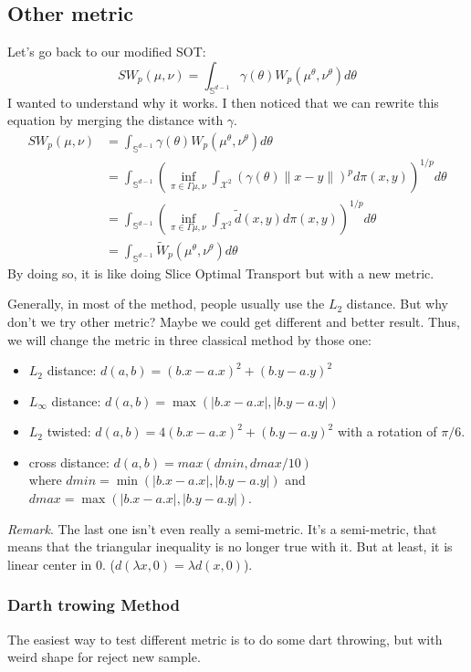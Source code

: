 \documentclass{classeENS}
\begin{document}
\subsection{Other metric}

Let's go back to our modified SOT:
\[SW_p(\mu, \nu) = \int_{\mathbb{S}^{d-1}} \gamma(\theta) W_p(\mu^\theta,\nu^\theta) d\theta\]
I wanted to understand why it works. I then noticed that we can rewrite this equation by merging
the distance with $\gamma$. 
\begin{align*}
    SW_p(\mu, \nu) &= \int_{\mathbb{S}^{d-1}} \gamma(\theta) W_p(\mu^\theta,\nu^\theta) d\theta \\
    &= \int_{\mathbb{S}^{d-1}} \left (\inf_{\pi \in \Gamma{\mu,\nu}} \int_{\mathcal X^2} 
    (\gamma(\theta) \lVert x-y \rVert)^p d\pi(x,y) \right )^{1/p} d\theta \\
    &= \int_{\mathbb{S}^{d-1}} \left (\inf_{\pi \in \Gamma{\mu,\nu}} \int_{\mathcal X^2} 
    \tilde d(x,y) d\pi(x,y) \right )^{1/p} d\theta \\
    &= \int_{\mathbb{S}^{d-1}} \tilde W_p(\mu^\theta,\nu^\theta) d\theta
\end{align*}
By doing so, it is like doing Slice Optimal Transport but with a
new metric.

\> Generally, in most of the method, people usually use the $L_2$ distance. But why don't we
try other metric? Maybe we could get different and better result. Thus, we will change
the metric in three classical method by those one:
    \begin{itemize}
        \item $L_2$ distance: $d(a,b) = (b.x-a.x)^2 + (b.y-a.y)^2$
        \item $L_\infty$ distance: $d(a,b) = \max( |b.x-a.x|, |b.y-a.y|)$
        \item $L_2$ twisted: $d(a,b) = 4(b.x-a.x)^2 + (b.y-a.y)^2$ with a rotation of $\pi/6$.
        \item cross distance: $d(a,b) = max(dmin,dmax/10)$ \\
            where $dmin = \min(|b.x-a.x|, |b.y-a.y|)$ and $dmax = \max(|b.x-a.x|, |b.y-a.y|)$.
    \end{itemize}
\> \textit{Remark}. The last one isn't even really a semi-metric. It's a semi-metric, 
    that means that the triangular inequality is no longer true with it. But at least,
    it is linear center in 0. ($d(\lambda x,0) = \lambda d(x,0)$).

\subsubsection{Darth trowing Method}
    The easiest way to test different metric is to do some dart throwing, but with weird
    shape for reject new sample.
\end{document}
